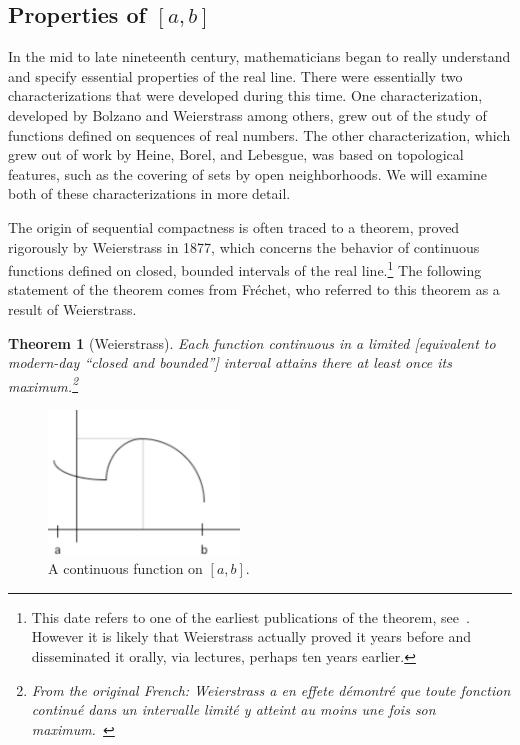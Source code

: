 \documentclass[12pt]{article}
\newtheorem{thm}{Theorem}[section]
\begin{document}
\subsection{Properties of $[a,b]$}

In the mid to late nineteenth century, mathematicians began to really understand and specify essential properties of the real line. There were essentially two characterizations that were developed during this time. One characterization, developed by Bolzano and Weierstrass among others, grew out of the study of functions defined on sequences of real numbers. The other characterization, which grew out of work by Heine, Borel, and Lebesgue, was based on topological features, such as the covering of sets by open neighborhoods. We will examine both of these characterizations in more detail.

The origin of sequential compactness is often traced to a theorem, proved rigorously by Weierstrass in 1877, which concerns the behavior of continuous functions defined on closed, bounded intervals of the real line.\footnote{This date refers to one of the earliest publications of the theorem, see~\cite{weie}. However it is likely that Weierstrass actually proved it years before and disseminated it orally, via lectures, perhaps ten years earlier.} The following statement of the theorem comes from Fr\'{e}chet, who referred to this theorem as a result of Weierstrass.

\begin{thm}[Weierstrass] Each function continuous in a limited [equivalent to modern-day ``closed and bounded''] interval attains there at least once its maximum.\footnote{From the original French: Weierstrass a en effete d\'{e}montr\'{e} que toute fonction continu\'{e} dans un intervalle limit\'{e} y atteint au moins une fois son maximum.~\cite[p. 848]{fre1}}
\label{thm:WMT}
\end{thm}

\begin{figure}[h]
\label{fig1}
  \begin{center}
  \includegraphics[width=2in]{funmax.pdf}
 \end{center}
 \caption{A continuous function on $[a,b]$.}
  \end{figure}
\end{document}
